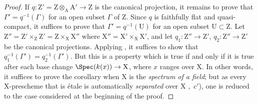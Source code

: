 \begin{proof}
If $q:\mathrm{Z}'=\mathrm{Z}\otimes_{\mathrm{A}}\mathrm{A}'\to\mathrm{Z}$ is the canonical projection, it remains to prove that $\Gamma'=q^{-1}(\Gamma)$ for an open subset $\Gamma$ of Z.
Since $q$ is faithfully flat and quasi-compact, it suffices  to prove that $\Gamma'=q^{-1}(\mathrm{U})$ for an open subset $\mathrm{U}\subset\mathrm{Z}$.
Let $\mathrm{Z}''=\mathrm{Z}'\times_{\mathrm{Z}}\mathrm{Z}'=\mathrm{Z}\times_{\mathrm{X}}\mathrm{X}''$ where $\mathrm{X}''=\mathrm{X}'\times_{\mathrm{X}}\mathrm{X}'$, and let $q_1:\mathrm{Z}''\to\mathrm{Z}'$, $q_2:\mathrm{Z}''\to\mathrm{Z}'$ be the canonical projections.
Applying , it suffices to show that $q_1^{-1}(\Gamma')=q_2^{-1}(\Gamma')$.
But this is a property which is true if and only if it is true after each base change $\Spec(k(x))\to\mathrm{X}$, where $x$ ranges over X.
In other words, it suffices to prove the corollary when X is the \emph{spectrum of a field};
but as every X-prescheme that is \'{e}tale is automatically \emph{separated} over X ,~$c'$), one is reduced to the case considered at the beginning of the proof.
\end{proof}

